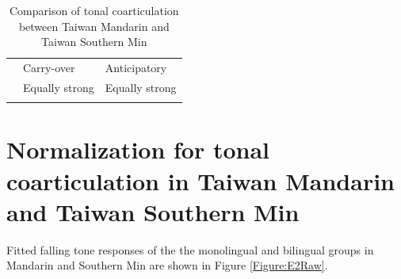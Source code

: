 \documentclass[12pt]{report}
\begin{document}
\begin{CJK}{UTF8}{bsmi}
\begin{flushleft}
\begin{table}[hbt!]
\begin{tabularx}{\textwidth}{l|X|X|}
\cline{2-3}
 & Carry-over & Anticipatory \\
\hhline{~|--}\noalign{\vspace*{\doublerulesep}}
\hhline{-||--}
\multicolumn{1}{|X||}{Taiwan Mandarin} & \multirow{2}{*}{Equally strong} & \multirow{2}{*}{Equally strong}\\
\hhline{|-||~~}
\multicolumn{1}{|X||}{Taiwan Southern Min} &  & \\
\hhline{|-||-|-|}
\end{tabularx}
\caption{Comparison of tonal coarticulation between Taiwan Mandarin and Taiwan Southern Min}
\label{table:MandarinMinDistributionComparison}
\end{table}
\end{flushleft}

\section{Normalization for tonal coarticulation in Taiwan Mandarin and Taiwan Southern Min}
Fitted falling tone responses of the the monolingual and bilingual groups in Mandarin and Southern Min are shown in Figure \ref{Figure:E2Raw}.


\end{CJK}
\end{document}
